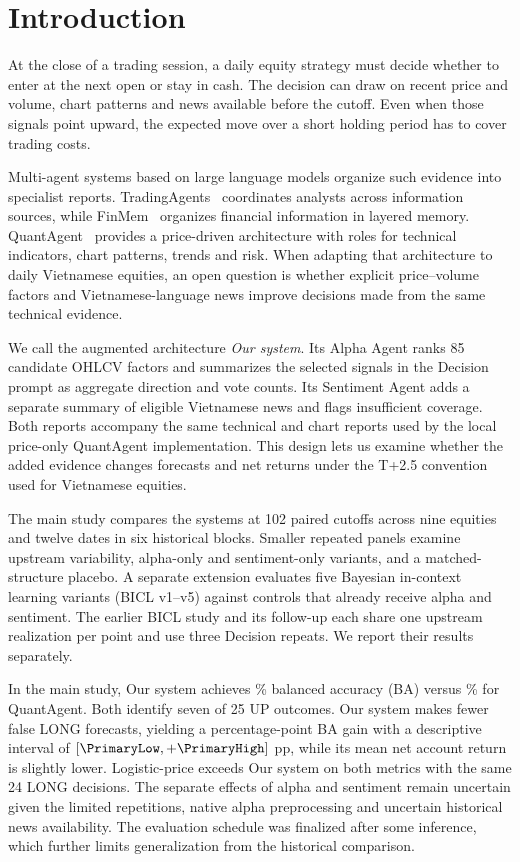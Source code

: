 \section{Introduction}
\label{sec:introduction}

At the close of a trading session, a daily equity strategy must
decide whether to enter at the next open or stay in cash. The decision
can draw on recent price and volume, chart patterns and news available
before the cutoff. Even when those signals point upward, the expected
move over a short holding period has to cover trading costs.

Multi-agent systems based on large language models organize such evidence
into specialist reports. TradingAgents~\cite{tradingagents2024} coordinates
analysts across information sources, while FinMem~\cite{yu2025finmem}
organizes financial information in layered memory.
QuantAgent~\cite{xiong2025quantagent} provides a price-driven architecture
with roles for technical indicators, chart patterns, trends and risk. When adapting that
architecture to daily Vietnamese equities, an open question is whether
explicit price--volume factors and Vietnamese-language news improve
decisions made from the same technical evidence.

We call the augmented architecture \emph{Our system}. Its Alpha Agent
ranks 85 candidate OHLCV factors and summarizes the selected signals in
the Decision prompt as aggregate direction and vote counts. Its Sentiment
Agent adds a separate summary of eligible Vietnamese news and flags
insufficient coverage. Both reports accompany the same technical and
chart reports used by the local price-only QuantAgent implementation.
This design lets us examine whether the added evidence changes forecasts
and net returns under the T+2.5 convention used for Vietnamese equities.

The main study compares the systems at 102 paired cutoffs across nine
equities and twelve dates in six historical blocks. Smaller repeated
panels examine upstream variability, alpha-only and sentiment-only
variants, and a matched-structure placebo. A separate extension evaluates
five Bayesian in-context learning variants (BICL v1--v5) against controls
that already receive alpha and sentiment. The earlier BICL study and
its follow-up each share one upstream realization per point and use
three Decision repeats. We report their results separately.

In the main study, Our system achieves \FullBA\% balanced accuracy (BA)
versus \BaseBA\% for QuantAgent. Both identify seven of 25 UP outcomes.
Our system makes fewer false LONG forecasts, yielding a \DeltaBA{}
percentage-point BA gain with a descriptive interval of
$[\PrimaryLow,+\PrimaryHigh]$ pp, while its mean net account return is
slightly lower. Logistic-price exceeds Our system on both metrics with
the same 24 LONG decisions. The separate effects of alpha and sentiment
remain uncertain given the limited repetitions, native alpha
preprocessing and uncertain historical news availability. The evaluation
schedule was finalized after some inference, which further limits
generalization from the historical comparison.

